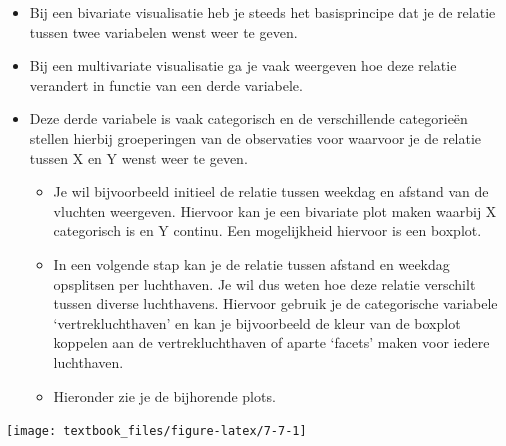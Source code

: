 \documentclass[]{tufte-book}
\newenvironment{Shaded}{}{}
\newcommand{\DataTypeTok}[1]{\textcolor[rgb]{0.56,0.13,0.00}{#1}}
\newcommand{\DecValTok}[1]{\textcolor[rgb]{0.25,0.63,0.44}{#1}}
\newcommand{\KeywordTok}[1]{\textcolor[rgb]{0.00,0.44,0.13}{\textbf{#1}}}
\newcommand{\NormalTok}[1]{#1}
\newcommand{\OperatorTok}[1]{\textcolor[rgb]{0.40,0.40,0.40}{#1}}
\newcommand{\StringTok}[1]{\textcolor[rgb]{0.25,0.44,0.63}{#1}}
\providecommand{\tightlist}{%
  \setlength{\itemsep}{0pt}\setlength{\parskip}{0pt}}
\begin{document}
\begin{itemize}
\tightlist
\item
  Bij een bivariate visualisatie heb je steeds het basisprincipe dat je de relatie tussen twee variabelen wenst weer te geven.
\item
  Bij een multivariate visualisatie ga je vaak weergeven hoe deze relatie verandert in functie van een derde variabele.
\item
  Deze derde variabele is vaak categorisch en de verschillende categorieën stellen hierbij groeperingen van de observaties voor waarvoor je de relatie tussen X en Y wenst weer te geven.

  \begin{itemize}
  \tightlist
  \item
    Je wil bijvoorbeeld initieel de relatie tussen weekdag en afstand van de vluchten weergeven. Hiervoor kan je een bivariate plot maken waarbij X categorisch is en Y continu. Een mogelijkheid hiervoor is een boxplot.
  \item
    In een volgende stap kan je de relatie tussen afstand en weekdag opsplitsen per luchthaven. Je wil dus weten hoe deze relatie verschilt tussen diverse luchthavens. Hiervoor gebruik je de categorische variabele `vertrekluchthaven' en kan je bijvoorbeeld de kleur van de boxplot koppelen aan de vertrekluchthaven of aparte `facets' maken voor iedere luchthaven.
  \item
    Hieronder zie je de bijhorende plots.
  \end{itemize}
\end{itemize}

\begin{Shaded}
\end{Shaded}

\texttt{[image: textbook\_files/figure-latex/7-7-1]}

\begin{Shaded}
\end{Shaded}
\end{document}
